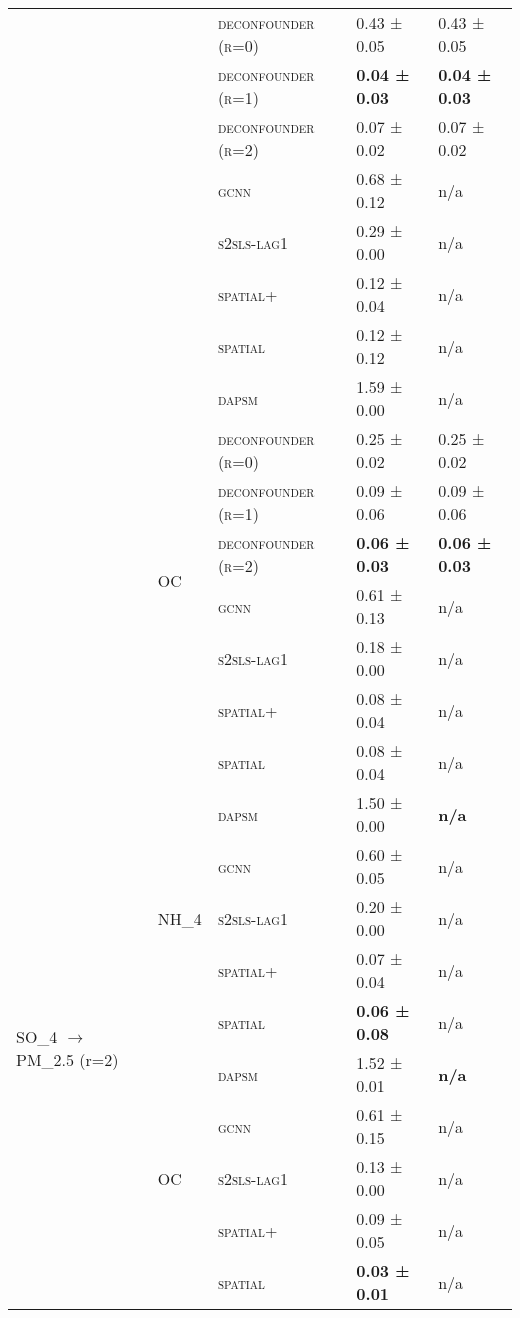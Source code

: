 \documentclass{article}
\begin{document}
\begin{table}[!tbp]
\begin{tabular}{lllll}
 &  & \textsc{deconfounder (r=0)} & 0.43 ± {\small 0.05} & 0.43 ± {\small 0.05} \\
 &  & \textsc{deconfounder (r=1)} & \bf 0.04 ± {\small 0.03} & \bf 0.04 ± {\small 0.03} \\
 &  & \textsc{deconfounder (r=2)} & 0.07 ± {\small 0.02} & 0.07 ± {\small 0.02} \\
 &  & \textsc{gcnn} & 0.68 ± {\small 0.12} & n/a \\
 &  & \textsc{s2sls-lag1} & 0.29 ± {\small 0.00} & n/a \\
 &  & \textsc{spatial+} & 0.12 ± {\small 0.04} & n/a \\
 &  & \textsc{spatial} & 0.12 ± {\small 0.12} & n/a \\
\cline{2-5}
 & \multirow[t]{8}{*}{OC} & \textsc{dapsm} & 1.59 ± {\small 0.00} & n/a \\
 &  & \textsc{deconfounder (r=0)} & 0.25 ± {\small 0.02} & 0.25 ± {\small 0.02} \\
 &  & \textsc{deconfounder (r=1)} & 0.09 ± {\small 0.06} & 0.09 ± {\small 0.06} \\
 &  & \textsc{deconfounder (r=2)} & \bf 0.06 ± {\small 0.03} & \bf 0.06 ± {\small 0.03} \\
 &  & \textsc{gcnn} & 0.61 ± {\small 0.13} & n/a \\
 &  & \textsc{s2sls-lag1} & 0.18 ± {\small 0.00} & n/a \\
 &  & \textsc{spatial+} & 0.08 ± {\small 0.04} & n/a \\
 &  & \textsc{spatial} & 0.08 ± {\small 0.04} & n/a \\
\cline{1-5} \cline{2-5}
\multirow[t]{10}{*}{SO_{4} $\to$ PM_{2.5} (r=2)} & \multirow[t]{5}{*}{NH_4} & \textsc{dapsm} & 1.50 ± {\small 0.00} & \bf n/a \\
 &  & \textsc{gcnn} & 0.60 ± {\small 0.05} & n/a \\
 &  & \textsc{s2sls-lag1} & 0.20 ± {\small 0.00} & n/a \\
 &  & \textsc{spatial+} & 0.07 ± {\small 0.04} & n/a \\
 &  & \textsc{spatial} & \bf 0.06 ± {\small 0.08} & n/a \\
\cline{2-5}
 & \multirow[t]{5}{*}{OC} & \textsc{dapsm} & 1.52 ± {\small 0.01} & \bf n/a \\
 &  & \textsc{gcnn} & 0.61 ± {\small 0.15} & n/a \\
 &  & \textsc{s2sls-lag1} & 0.13 ± {\small 0.00} & n/a \\
 &  & \textsc{spatial+} & 0.09 ± {\small 0.05} & n/a \\
 &  & \textsc{spatial} & \bf 0.03 ± {\small 0.01} & n/a \\
\cline{1-5} \cline{2-5}
\bottomrule
\end{tabular}

\end{table}
\end{document}
